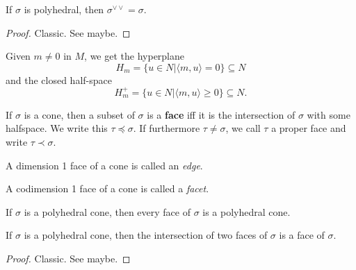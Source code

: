 \begin{proposition}
  \label{1-2-4-double-dual-polyhedral-cone}

  If $\sigma$ is polyhedral, then $\sigma^{\vee\vee} = \sigma$.
\end{proposition}
\begin{proof}

  Classic. See \cite{Oda_1988} maybe.
\end{proof}


Given $m \ne 0$ in $M$, we get the hyperplane
$$H_m = \{u \in N | \langle m, u\rangle = 0\} \subseteq N$$
and the closed half-space
$$H_m^+ = \{u \in N | \langle m, u\rangle \ge 0\} \subseteq N.$$


\begin{definition}
  \label{1-2-5-face}
  \leanok

  If $\sigma$ is a cone, then a subset of $\sigma$ is a {\bf face} iff it is the intersection of $\sigma$ with some halfspace. We write this $\tau \preceq \sigma$. If furthermore $\tau \ne \sigma$, we call $\tau$ a proper face and write $\tau \prec \sigma$.
\end{definition}


\begin{definition}
  \label{1-2-5-edge}

  A dimension 1 face of a cone is called an \emph{edge}.
\end{definition}


\begin{definition}
  \label{1-2-5-facet}

  A codimension 1 face of a cone is called a \emph{facet}.
\end{definition}


\begin{lemma}
  \label{1-2-6-face-polyhedral-cone}

  If $\sigma$ is a polyhedral cone, then every face of $\sigma$ is a polyhedral cone.
\end{lemma}


\begin{lemma}
  \label{1-2-6-inter-faces}

  If $\sigma$ is a polyhedral cone, then the intersection of two faces of $\sigma$ is a face of $\sigma$.
\end{lemma}
\begin{proof}

  Classic. See \cite{Oda_1988} maybe.
\end{proof}


